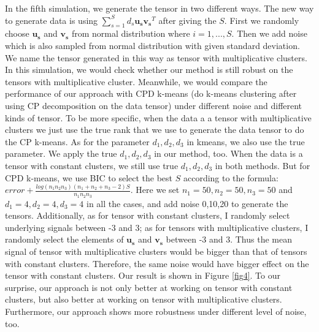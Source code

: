 \documentclass{article}
\begin{document}
In the fifth simulation, we generate the tensor in two different ways. The new way to generate data is using $\sum_{s=1}^{S}d_s\mathbf{u_s}\mathbf{v_s}^T$ after giving the $S$.  First we randomly choose $\mathbf{u_s}$ and $\mathbf{v_s}$ from normal distribution where $i=1,...,S$. Then we add noise which is also sampled from normal distribution with given standard deviation. We name the tensor generated in this way as tensor with multiplicative clusters. In this simulation, we would check whether our method is still robust on the tensors with multiplicative cluster. Meanwhile, we would compare the performance of our approach with CPD k-means (do k-means clustering after using CP decomposition on the data tensor) under different noise and different kinds of tensor. To be more specific, when the data a a tensor with  multiplicative clusters we just use the true rank that we use to generate the data tensor to do the CP k-means. As for the parameter $d_1, d_2, d_3$ in kmeans, we also use the true parameter. We apply the true $d_1, d_2, d_3$ in our method, too. When the data is a tensor with constant clusters, we still use true $d_1, d_2, d_3$ in both methods. But for CPD k-means, we use BIC to select the best $S$ according to the formula: $error+\frac{log(n_1n_2n_3)(n_1+n_2+n_3-2)S}{n_1n_2n_3}$.  Here we set  $n_1=50,n_2=50,n_3=50$ and $d_1=4,d_2=4,d_3=4$ in all the cases, and add noise 0,10,20 to generate the tensors. Additionally, as for tensor with constant clusters, I randomly select underlying signals between -3 and 3; as for tensors with multiplicative clusters, I randomly select the elements of $\mathbf{u_s}$ and $\mathbf{v_s}$ between -3 and 3. Thus the mean signal of tensor with multiplicative clusters would be bigger than that of tensors with constant clusters. Therefore, the same noise would have bigger effect on the tensor with constant clusters. Our result is shown in Figure \ref{fig4}. To our surprise, our approach is not only better at working on tensor with constant clusters, but also better at working on tensor with multiplicative clusters. Furthermore, our approach shows more robustness under different level of noise, too. \par 
\end{document}
